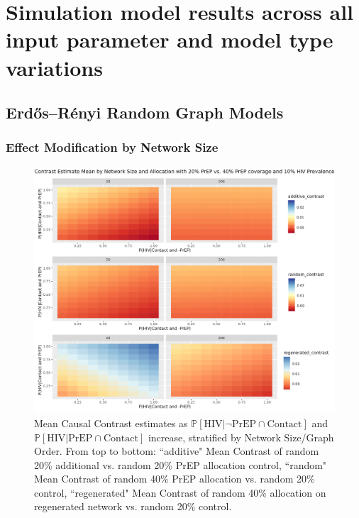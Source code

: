 \documentclass{article}
\theoremstyle{definition}
\begin{document}
\newpage

\section{Simulation model results across all input parameter and model type variations}
\label{sec: F}

\subsection{Erdős–Rényi  Random Graph Models}

\subsubsection{Effect Modification by Network Size}
\begin{figure}[H]
    \centering
    \includegraphics[width=\linewidth]{Corrected Figures/Network Size Mean Plot.png}
    \caption{Mean Causal Contrast estimates as $\mathbb{P}\left[\text{HIV} \vert \neg \text{PrEP} \cap \text{Contact}\right]$ and $\mathbb{P}\left[\text{HIV} \vert \text{PrEP} \cap \text{Contact}\right]$ increase, stratified by Network Size/Graph Order. From top to bottom: ``additive" Mean Contrast of random 20\% additional vs. random 20\% PrEP allocation control, ``random" Mean Contrast of random 40\% PrEP allocation vs. random 20\% control, ``regenerated" Mean Contrast of random 40\% allocation on regenerated network vs. random 20\% control. }
    \label{fig: Figure S4.1}
\end{figure}
\end{document}
